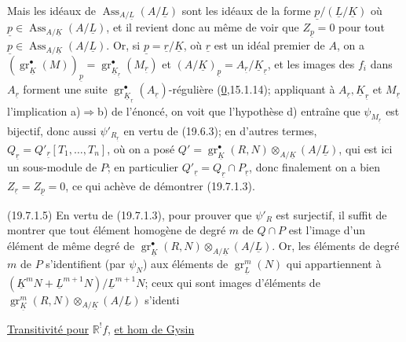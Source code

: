 Mais les idéaux de $\operatorname{Ass}_{A/\underline L}(A/\underline L)$ sont les idéaux de la forme
$\underline p/(\underline L/\underline K)$ où
$\underline p\in\operatorname{Ass}_{A/\underline K}(A/\underline L)$, et il revient donc au même de voir que
$Z_{\underline p}=0$ pour tout
$\underline p\in\operatorname{Ass}_{A/\underline K}(A/\underline L)$.
Or, si $\underline p=\underline r/\underline K$, où $\underline r$ est un idéal premier de $A$, on a
$(\operatorname{gr}_{\underline K}^\bullet(M))_{\underline p}
 =\operatorname{gr}_{\underline K_{\underline r}}^\bullet(M_{\underline r})$
et $(A/\underline K)_{\underline p}=A_{\underline r}/\underline K_{\underline r}$,
et les images des $f_i$ dans $A_{\underline r}$ forment
une suite $\operatorname{gr}_{\underline K_{\underline r}}^\bullet(A_{\underline r})$-régulière
(\uline{0},15.1.14); appliquant à $A_{\underline r},\underline K_{\underline r}$ et
$M_{\underline r}$ l'implication a)$\Rightarrow$b) de l'énoncé, on voit que
l'hypothèse d) entraîne que $\psi_{M_{\underline r}}$ est bijectif, donc aussi
$\psi'_{R_{\underline r}}$ en vertu
de (19.6.3); en d'autres termes, $Q_{\underline r}=Q'_{\underline r}[T_1,\ldots,T_n]$,
où on a posé
$Q'=\operatorname{gr}_{\underline K}^\bullet(R,N)\otimes_{A/\underline K}(A/\underline L)$,
qui est ici un sous-module de $P$; en particulier
$Q'_{\underline r}=Q_{\underline r}\cap P_{\underline r}$, donc finalement on a bien
$Z_{\underline r}=Z_{\underline p}=0$, ce qui achève de
démontrer (19.7.1.3).

(19.7.1.5) En vertu de (19.7.1.3), pour prouver que $\psi'_R$ est surjectif,
il suffit de montrer que tout élément homogène de degré $m$ de $Q\cap P$ est
l'image d'un élément de même degré de
$\operatorname{gr}_{\underline K}^\bullet(R,N)\otimes_{A/\underline K}(A/\underline L)$.
Or, les éléments
de degré $m$ de $P$ s'identifient
(par $\psi_N$) aux éléments
 de $\operatorname{gr}_{\underline L}^m(N)$
qui appartiennent à
$(\underline K^mN+\underline L^{m+1}N)/\underline L^{m+1}N$; ceux
qui sont images d'éléments  de
$\operatorname{gr}_{\underline K}^m(R,N)\otimes_{A/\underline K}(A/\underline L)$ s'identi

\uline{Transitivité pour} $\mathbb{R}^!f$, \uline{et hom de Gysin}

